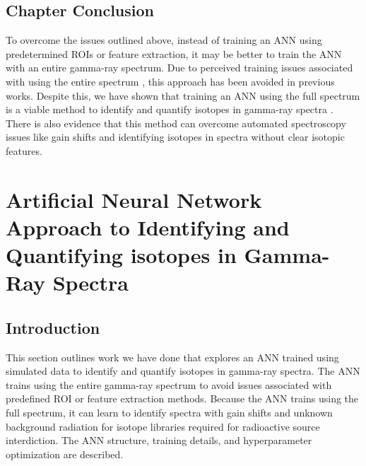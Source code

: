 \documentclass[tocnosub,noragright,centerchapter,12pt,fullpage]{uiucecethesis09}
\begin{document}
\section{Chapter Conclusion}

To overcome the issues outlined above, instead of training an ANN using predetermined ROIs or feature extraction, it may be better to train the ANN with an entire gamma-ray spectrum. Due to perceived training issues associated with using the entire spectrum \cite{Pilato1999,Yoshida2002}, this approach has been avoided in previous works. Despite this, we have shown that training an ANN using the full spectrum is a viable method to identify and quantify isotopes in gamma-ray spectra \cite{kamuda2017,kamudaThesis2017}. There is also evidence that this method can overcome automated spectroscopy issues like gain shifts and identifying isotopes in spectra without clear isotopic features.





\chapter{Artificial Neural Network Approach to Identifying and Quantifying isotopes in Gamma-Ray Spectra}

\section{Introduction}

This section outlines work we have done that explores an ANN trained using simulated data to identify and quantify isotopes in gamma-ray spectra. The ANN trains using the entire gamma-ray spectrum to avoid issues associated with predefined ROI or feature extraction methods. Because the ANN trains using the full spectrum, it can learn to identify spectra with gain shifts and unknown background radiation for isotope libraries required for radioactive source interdiction. The ANN structure, training details, and hyperparameter optimization are described. 
\end{document}
